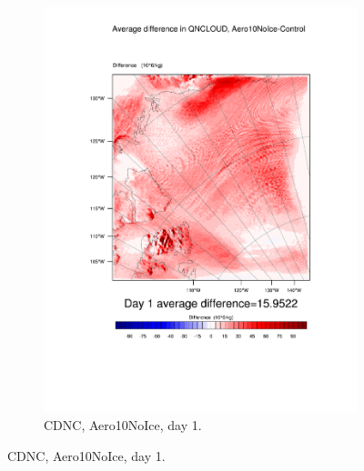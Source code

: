 \begin{figure}
\begin{subfigure}{0.48\textwidth}
		\includegraphics[width=\textwidth]{results/aero10ni/diff_Aero10NoIce_QNCLOUD_Day1.pdf}
		\caption{CDNC, Aero10NoIce, day 1.}
		\label{subfig:CDNCr4Day1}
	\end{subfigure}
	

\end{figure}
